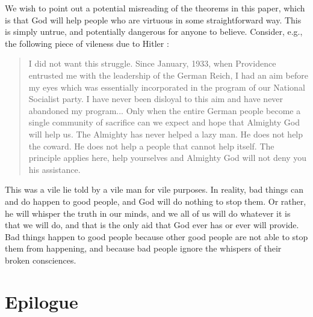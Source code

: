 \documentclass{article}
\begin{document}
We wish to point out a potential misreading of the theorems in this
paper, which is that God will help people who are virtuous in some
straightforward way. This is simply untrue, and potentially dangerous
for anyone to believe. Consider, e.g., the following piece of vileness
due to Hitler \cite{hitler}:
\begin{quote}
I did not want this struggle. Since January, 1933, when Providence
entrusted me with the leadership of the German Reich, I had an aim
before my eyes which was essentially incorporated in the program of
our National Socialist party. I have never been disloyal to this aim
and have never abandoned my program... Only when the entire German
people become a single community of sacrifice can we expect and hope
that Almighty God will help us. The Almighty has never helped a lazy
man. He does not help the coward. He does not help a people that
cannot help itself. The principle applies here, help yourselves and
Almighty God will not deny you his assistance.
\end{quote}

This was a vile lie told by a vile man for vile purposes. In reality,
bad things can and do happen to good people, and God will do nothing
to stop them. Or rather, he will whisper the truth in our minds, and
we all of us will do whatever it is that we will do, and that is the
only aid that God ever has or ever will provide. Bad things happen to
good people because other good people are not able to stop them from
happening, and because bad people ignore the whispers of their broken
consciences.

\section{Epilogue}
\end{document}
